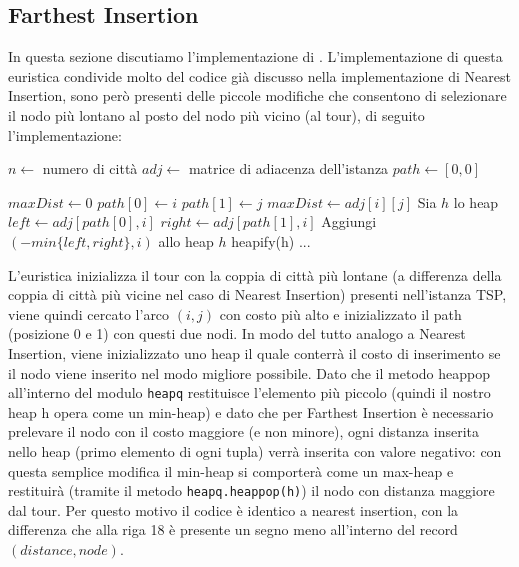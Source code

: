 \documentclass[a4paper,12pt]{report}
\begin{document}
\subsection{Farthest Insertion}
In questa sezione discutiamo l'implementazione di . L'implementazione di questa euristica condivide molto del codice già discusso nella implementazione di Nearest Insertion, sono però presenti delle piccole modifiche che consentono di selezionare il nodo più lontano al posto del nodo più vicino (al tour), di seguito l'implementazione:
\begin{tcolorbox}[colframe=black, colback=white, boxrule=0.5pt, title=Farthest Insertion, coltitle=black, fonttitle=\bfseries, colbacktitle=white, breakable]
  \begin{algorithmic}[1]
    \State $n \gets$ numero di città
    \State $adj \gets$ matrice di adiacenza dell'istanza
    \State $path \gets [0, 0]$
    
    \State $maxDist \gets 0$
          \State $path[0] \gets i$
          \State $path[1] \gets j$
          \State $maxDist \gets adj[i][j]$
        \EndIf
      \EndFor
    \EndFor
    \State Sia $h$ lo heap
      \State $left \gets adj[path[0], i]$
      \State $right \gets adj[path[1], i]$
      \State Aggiungi $(-min\{left, right\}, i)$ allo heap $h$
    \EndFor
    \State heapify(h)
    \State ...
  \end{algorithmic}
  \end{tcolorbox}
L'euristica inizializza il tour con la coppia di città più lontane (a differenza della coppia di città più vicine nel caso di Nearest Insertion) presenti nell'istanza TSP, viene quindi cercato l'arco $(i, j)$ con costo più alto e inizializzato il path (posizione 0 e 1) con questi due nodi.
In modo del tutto analogo a Nearest Insertion, viene inizializzato uno heap il quale conterrà il costo di inserimento se il nodo viene inserito nel modo migliore possibile. Dato che il metodo heappop all'interno del modulo \lstinline!heapq! restituisce l'elemento più piccolo (quindi il nostro heap h opera come un min-heap) e dato che per Farthest Insertion è necessario prelevare il nodo con il costo maggiore (e non minore), ogni distanza inserita nello heap (primo elemento di ogni tupla) verrà inserita con valore negativo: con questa semplice modifica il min-heap si comporterà come un max-heap e restituirà (tramite il metodo \lstinline!heapq.heappop(h)!) il nodo con distanza maggiore dal tour. Per questo motivo il codice è identico a nearest insertion, con la differenza che alla riga 18 è presente un segno meno all'interno del record $(distance, node)$.
\end{document}
